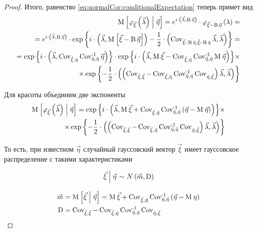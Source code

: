 \begin{proof}
  Итого, равенство \ref{eq:normalCor:conditionalExpectation} теперь примет вид
  \begin{align*}
      \Mean{\varphi_{\vec{\xi}}\left( \vec{\lambda} \right) \mcond \vec{\eta}}
      = e^{i \cdot \left( \vec{\lambda}, \operatorname{B} \vec{\eta} \right)}
      \cdot \varphi_{\vec{\xi} - \operatorname{B} \vec{\eta}}\left(
          \lambda \right) = \\
      = e^{i \cdot \left( \vec{\lambda}, \operatorname{B} \vec{\eta} \right)}
      \cdot \exp{\left\{ 
            i \cdot \left( \vec{\lambda},
            \Mean{\vec{\xi} - \operatorname{B} \vec{\eta}} \right)
            - \frac{1}{2} \cdot \left( \dCov{\vec{\xi}
        - \operatorname{B} \vec{\eta}} \vec{\lambda},
        \vec{\lambda} \right)
        \right\}} = \\
      = \exp{\left\{i \cdot \left( \vec{\lambda}, \Cov{\vec{\xi}}{\vec{\eta}}
          \dCov[-1]{\vec{\eta}} \vec{\eta} \right)\right\}}
      \cdot \exp{\left\{ 
            i \cdot \left( \vec{\lambda},
        \mean{\vec{\xi}} - \Cov{\vec{\xi}}{\vec{\eta}}
            \dCov[-1]{\vec{\eta}} \mean{\vec{\eta}} \right)
        \right\}} \times \\
      \times \exp{\left\{ - \frac{1}{2} \cdot \left(
            \left( \dCov{\vec{\xi}} - \Cov{\vec{\xi}}{\vec{\eta}}
        \dCov[-1]{\vec{\eta}} \Cov{\vec{\eta}}{\vec{\xi}}
            \right) \vec{\lambda},
            \vec{\lambda} \right) \right\}}
  \end{align*}

  Для красоты объединим две экспоненты
  \begin{align*}
      \Mean{\varphi_{\vec{\xi}}\left( \vec{\lambda} \right) \mcond \vec{\eta}}
      = \exp{\left\{i \cdot \left( \vec{\lambda},
        \mean{\vec{\xi}} + \Cov{\vec{\xi}}{\vec{\eta}}
            \dCov[-1]{\vec{\eta}} \left(
        \vec{\eta} - \mean{\vec{\eta}} \right) \right)
          \right\}} \times \\
      \times \exp{\left\{- \frac{1}{2} \cdot \left(
            \left( \dCov{\vec{\xi}} - \Cov{\vec{\xi}}{\vec{\eta}}
        \dCov[-1]{\vec{\eta}} \Cov{\vec{\eta}}{\vec{\xi}}
            \right) \vec{\lambda},
            \vec{\lambda} \right)\right\}}
  \end{align*}

  То есть, при известном $\vec{\eta}$ случайный гауссовский вектор
  $\vec{\xi}$ имеет гауссовское распределение с такими характеристиками

  $$\left. \vec{\xi} \mcond \vec{\eta} \right. \sim N\left( \vec{m},
      \operatorname{D} \right)$$
  
  \begin{align*}
  \vec{m}
      &= \Mean{\vec{\xi} \mcond \vec{\eta}}
      = \mean{\vec{\xi}} + \Cov{\vec{\xi}}{\vec{\eta}}
      \dCov[-1]{\vec{\eta}}\left( \vec{\eta} - \mean{\eta} \right) \\
  \operatorname{D}
      &= \dCov{\vec{\xi}} - \Cov{\vec{\xi}}{\vec{\eta}} \dCov[-1]{\vec{\eta}}
      \Cov{\vec{\eta}}{\vec{\xi}}
  \end{align*}
\end{proof}

